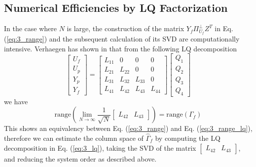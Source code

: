\subsection{Numerical Efficiencies by LQ Factorization}
In the case where $N$ is large, the construction of the matrix $Y_f\Pi_{U_f}^\perp Z^T$ in Eq. (\ref{eq:3_range}) and the subsequent calculation of its SVD are computationally intensive. Verhaegen has shown in \cite{verhaegen1994identification} that from the following LQ decomposition
\begin{equation}\label{eq:3_lq}
\begin{bmatrix}U_f\\ U_p\\ Y_p\\ Y_f\end{bmatrix} = 
\begin{bmatrix}
	L_{11} & 0 & 0 & 0\\
	L_{21} & L_{22} & 0 & 0\\
	L_{31} & L_{32} & L_{33} & 0\\
	L_{41} & L_{42} & L_{43} & L_{44}
\end{bmatrix}
\begin{bmatrix}Q_1\\ Q_2\\ Q_3\\ Q_4\end{bmatrix}
\end{equation}
we have
\begin{equation}\label{eq:3_range_lq}
\mbox{range}\left(\lim_{N\rightarrow\infty} \frac{1}{\sqrt{N}} \begin{bmatrix}L_{42} & L_{43}\end{bmatrix}\right) = \mbox{range}\left(\Gamma_f\right)
\end{equation}
This shows an equivalency between Eq. (\ref{eq:3_range}) and Eq. (\ref{eq:3_range_lq}), therefore we can estimate the column space of $\hat{\Gamma}_f$ by computing the LQ decomposition in Eq. (\ref{eq:3_lq}), taking the SVD of the matrix $\begin{bmatrix}L_{42} & L_{43}\end{bmatrix}$, and reducing the system order as described above.









